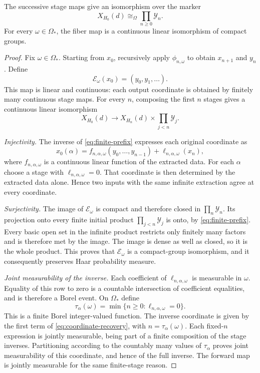 \documentclass[11pt,a4paper]{article}
\numberwithin{equation}{section}
\newcommand{\reliso}{\mathrel{\cong_{\Omega}}}
\newcommand{\cY}{\mathcal Y}
\begin{document}
\begin{proposition}\label{prop:exhaustion-isomorphism}
The successive stage maps give an isomorphism over the marker
\begin{equation}\label{eq:infinite-extraction}
 X_{H_0}(d)\reliso\prod_{n\geq0}\cY_n.
\end{equation}
For every $\omega\in\Omega_*$, the fiber map is a continuous linear
isomorphism of compact groups.
\end{proposition}
\begin{proof}
Fix $\omega\in\Omega_*$. Starting from $x_0$, recursively apply
$\phi_{n,\omega}$ to obtain $x_{n+1}$ and $y_n$. Define
\[
 \mathcal E_\omega(x_0)=(y_0,y_1,\ldots).
\]
This map is linear and continuous: each output coordinate is obtained
by finitely many continuous stage maps. For every $n$, composing the
first $n$ stages gives a continuous linear isomorphism
\begin{equation}\label{eq:finite-prefix}
 X_{H_0}(d)\longrightarrow
 X_{H_n}(d)\times\prod_{j<n}\cY_j.
\end{equation}

\emph{Injectivity.} The inverse of \eqref{eq:finite-prefix} expresses
each original coordinate as
\begin{equation}\label{eq:coordinate-recovery}
 x_0(\alpha)=
 f_{n,\alpha,\omega}(y_0,\ldots,y_{n-1})
       +\ell_{n,\alpha,\omega}(x_n),
\end{equation}
where $f_{n,\alpha,\omega}$ is a continuous linear function of the
extracted data. For each $\alpha$ choose a stage with
$\ell_{n,\alpha,\omega}=0$. That coordinate is then determined by
the extracted data alone. Hence two inputs with the same infinite
extraction agree at every coordinate.

\emph{Surjectivity.} The image of $\mathcal E_\omega$ is compact and
therefore closed in $\prod_n\cY_n$. Its projection onto every finite
initial product $\prod_{j<n}\cY_j$ is onto, by
\eqref{eq:finite-prefix}. Every basic open set in the infinite product
restricts only finitely many factors and is therefore met by the image.
The image is dense as well as closed, so it is the whole product.
This proves that $\mathcal E_\omega$ is a compact-group isomorphism,
and it consequently preserves Haar probability measure.

\emph{Joint measurability of the inverse.} Each coefficient of
$\ell_{n,\alpha,\omega}$ is measurable in $\omega$. Equality of this
row to zero is a countable intersection of coefficient equalities,
and is therefore a Borel event. On $\Omega_*$ define
\[
 \tau_\alpha(\omega)
   =\min\{n\geq0:\ell_{n,\alpha,\omega}=0\}.
\]
This is a finite Borel integer-valued function. The inverse coordinate
is given by the first term of \eqref{eq:coordinate-recovery}, with
$n=\tau_\alpha(\omega)$. Each fixed-$n$ expression is jointly
measurable, being part of a finite composition of the stage inverses.
Partitioning according to the countably many values of $\tau_\alpha$
proves joint measurability of this coordinate, and hence of the full
inverse. The forward map is jointly measurable for the same
finite-stage reason.


\end{proof}
\end{document}
